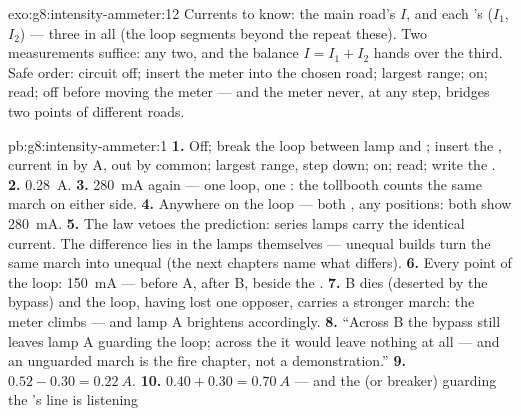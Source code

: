\begin{solution}{exo:g8:intensity-ammeter:12}
Currents to know: the main road's $I$, and each 's
($I_1$, $I_2$) --- three in all (the loop segments beyond the
 repeat these). Two measurements suffice:  any
two, and the  balance $I = I_1 + I_2$ hands over the
third. Safe order: circuit off; insert the meter into the
chosen road; largest range; on; read; off before moving the
meter --- and the meter never, at any step, bridges two points
of different roads.
\end{solution}

\begin{solution}{pb:g8:intensity-ammeter:1}
\textbf{1.} Off; break the loop between lamp and ;
insert the , current in by \unit{A}, out by common;
largest range, step down; on; read; write the .
\textbf{2.} \qty{0.28}{A}.
\textbf{3.} \qty{280}{mA} again --- one loop, one :
the tollbooth counts the same march on either side.
\textbf{4.} Anywhere on the loop --- both , any
positions: both show \qty{280}{mA}.
\textbf{5.} The law vetoes the prediction: series lamps carry
the identical current. The difference lies in the lamps
themselves --- unequal builds turn the same march into unequal
 (the next chapters name what differs).
\textbf{6.} Every point of the loop: \qty{150}{mA} --- before
A, after B, beside the .
\textbf{7.} B dies (deserted by the bypass) and the loop,
having lost one opposer, carries a stronger march: the meter
climbs --- and lamp A brightens accordingly.
\textbf{8.} ``Across B the bypass still leaves lamp A guarding
the loop; across the  it would leave nothing at all ---
and an unguarded march is the fire chapter, not a
demonstration.''
\textbf{9.} $0.52 - 0.30 = \qty{0.22}{A}$.
\textbf{10.} $0.40 + 0.30 = \qty{0.70}{A}$ --- and the 
 (or breaker) guarding the 's line is listening

\end{solution}
